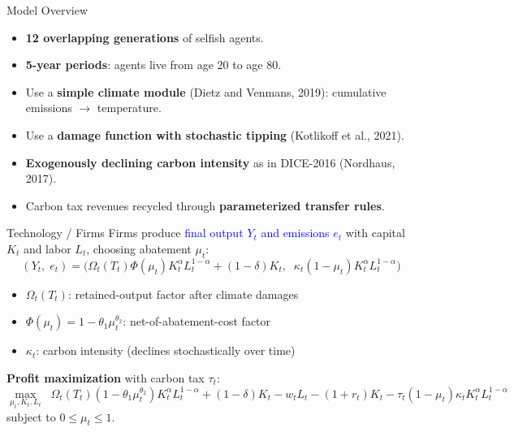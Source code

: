 \documentclass[aspectratio=169,11pt]{beamer}
\begin{document}
\begin{frame}{Model Overview}
\begin{itemize}
    \setlength\itemsep{0.8em}
    \item \textbf{12 overlapping generations} of selfish agents.
    \item \textbf{5-year periods}: agents live from age 20 to age 80.
    \item Use a \textbf{simple climate module} (Dietz and Venmans, 2019): cumulative emissions $\rightarrow$ temperature.
    \item Use a \textbf{damage function with stochastic tipping} (Kotlikoff et al., 2021).
    \item \textbf{Exogenously declining carbon intensity} as in DICE-2016 (Nordhaus, 2017).
    \item Carbon tax revenues recycled through \textbf{parameterized transfer rules}.
\end{itemize}
\end{frame}

\begin{frame}{Technology / Firms}
\small
Firms produce \textcolor{blue}{final output $Y_t$ and emissions $e_t$} with capital $K_t$ and labor $L_t$, choosing abatement $\mu_t$:
\begin{equation*}
(Y_t,\; e_t) = \Big(\Omega_t(T_t)\Phi(\mu_t) K_t^\alpha L_t^{1-\alpha} + (1-\delta)K_t,\;\; \kappa_t(1-\mu_t)K_t^\alpha L_t^{1-\alpha}\Big)
\end{equation*}

\begin{itemize}
    \item $\Omega_t(T_t)$: retained-output factor after climate damages
    \item $\Phi(\mu_t) = 1 - \theta_1 \mu_t^{\theta_2}$: net-of-abatement-cost factor
    \item $\kappa_t$: carbon intensity (declines stochastically over time)
\end{itemize}

\vspace{0.2cm}
\textbf{Profit maximization} with carbon tax $\tau_t$:
\[
\max_{\mu_t, K_t, L_t} \;\; \Omega_t(T_t)(1-\theta_1 \mu_t^{\theta_2})K_t^\alpha L_t^{1-\alpha} + (1-\delta)K_t - w_t L_t - (1+r_t)K_t - \tau_t(1-\mu_t)\kappa_t K_t^\alpha L_t^{1-\alpha}
\]
subject to $0 \leq \mu_t \leq 1$.
\end{frame}
\end{document}
